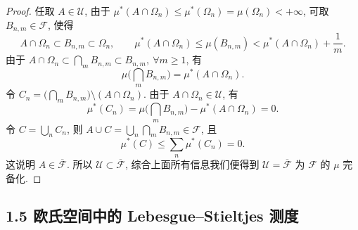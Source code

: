 \begin{proof}
            任取 $A\in\mathcal{U}$, 
            由于 $\mu^*(A\cap\Omega_n)\leqslant\mu^*(\Omega_n)=\mu(\Omega_n)<+\infty$, 
            可取 $B_{n,m}\in\mathcal{F}$, 使得
            \[
                A\cap\Omega_n\subset B_{n,m}\subset\Omega_n,\qquad \mu^*(A\cap\Omega_n)\leqslant\mu(B_{n,m})<\mu^*(A\cap\Omega_n)+\frac{1}{m}.
            \]
            由于 $A\cap\Omega_n\subset\displaystyle\bigcap_{m}B_{n,m}\subset B_{n,m},\ \forall m\geqslant1$, 有
            \[
                \mu\big(\bigcap_{m}B_{n,m}\big)=\mu^*(A\cap\Omega_n).
            \]
            令 $C_n=\big(\displaystyle\bigcap_{m}B_{n,m}\big)\setminus (A\cap\Omega_n)$. 由于 $A\cap\Omega_n\in\mathcal{U}$, 有
            \[
                \mu^*(C_n)=\mu\big(\bigcap_{m}B_{n,m}\big)-\mu^*(A\cap\Omega_n)=0.
            \]
            令 $C=\displaystyle\bigcup_{n}C_n$, 则 $A\cup C=\displaystyle\bigcup_{n}\bigcap_{m}B_{n,m}\in\mathcal{F}$, 且
            \[
                \mu^*(C)\leqslant\sum_{n}\mu^*(C_n)=0.
            \]
            这说明 $A\in\overline{\mathcal{F}}$. 
            所以 $\mathcal{U}\subset\overline{\mathcal{F}}$, 
            综合上面所有信息我们便得到 $\mathcal{U}=\overline{\mathcal{F}}$ 为 $\mathcal{F}$ 的 $\mu$ 完备化.


        \end{proof}
    \subsection{1.5 欧氏空间中的 Lebesgue--Stieltjes 测度}
